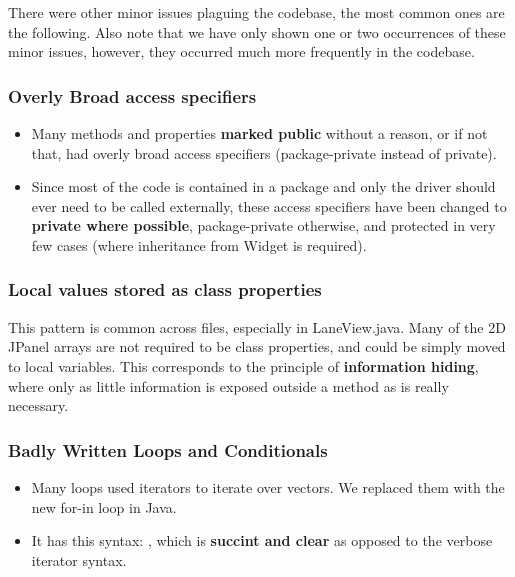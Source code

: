 There were other minor issues plaguing the codebase, the most common ones are the following. Also note that we have only shown one or two occurrences of these minor issues, however, they occurred much more frequently in the codebase.

\subsubsection{Overly Broad access specifiers}

\begin{itemize}

	\item Many methods and properties \textbf{marked public} without a reason, or if not that, had overly broad access specifiers (package-private instead of private).
	\item Since most of the code is contained in a package and only the driver should ever need to be called externally, these access specifiers have been changed to \textbf{private where possible}, package-private otherwise, and protected in very few cases (where inheritance from Widget is required).
\end{itemize}

\subsubsection{Local values stored as class properties}

This pattern is common across files, especially in LaneView.java. Many of the 2D JPanel arrays are not required to be class properties, and could be simply moved to local variables. This corresponds to the principle of \textbf{information hiding}, where only as little information is exposed outside a method as is really necessary.

\subsubsection{Badly Written Loops and Conditionals}

\begin{itemize}
	\item Many loops used iterators to iterate over vectors. We replaced them with the new for-in loop in Java.
	\item It has this syntax: , which is \textbf{succint and clear} as opposed to the verbose iterator syntax.
\end{itemize}

